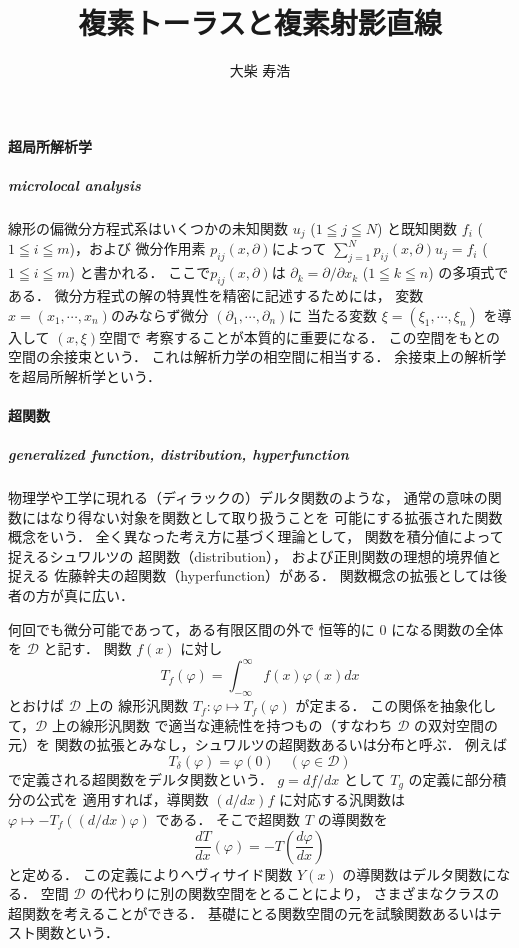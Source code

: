 \documentclass[11pt, a4paper, dvipdfmx]{jsarticle}
\theoremstyle{definition}
\newcommand{\dip}{\displaystyle} %
\newcommand{\pphi}{\varphi} %
\theoremstyle{mystyle}
\numberwithin{equation}{section} %
\begin{document}
\title{複素トーラスと複素射影直線}
\author{大柴 寿浩}
\date{}


\paragraph*{超局所解析学}
\subparagraph*{microlocal analysis}
線形の偏微分方程式系はいくつかの未知関数
$u_j$ ($1\leqq j \leqq N$) と既知関数 $f_i$ ($1\leqq i\leqq m$)，および
微分作用素 $p_{ij}(x, \partial)$によって
$\dip \sum_{j=1}^{N}p_{ij} (x, \partial)u_j=f_i$ ($1\leqq i\leqq m$) と書かれる．
ここで$p_{ij}(x, \partial)$は
$\partial_k=\partial/\partial x_k$ ($1\leqq k \leqq n$) の多項式である．
微分方程式の解の特異性を精密に記述するためには，
変数$x=(x_1,\cdots, x_n)$のみならず微分 $(\partial_1, \cdots, \partial_n)$に
当たる変数 $\xi=(\xi_1, \cdots, \xi_n)$ を導入して $(x, \xi)$空間で
考察することが本質的に重要になる．
この空間をもとの空間の余接束という．
これは解析力学の相空間に相当する．
余接束上の解析学を超局所解析学という．

\paragraph*{超関数}
\subparagraph*{generalized function, distribution, hyperfunction}
物理学や工学に現れる（ディラックの）デルタ関数のような，
通常の意味の関数にはなり得ない対象を関数として取り扱うことを
可能にする拡張された関数概念をいう．
全く異なった考え方に基づく理論として，
関数を積分値によって捉えるシュワルツの
超関数（distribution），
および正則関数の理想的境界値と捉える
佐藤幹夫の超関数（hyperfunction）がある．
関数概念の拡張としては後者の方が真に広い．

何回でも微分可能であって，ある有限区間の外で
恒等的に 0 になる関数の全体を $\mathcal{D}$ と記す．
関数 $f(x)$ に対し
\begin{equation*}
    T_f (\pphi) = \int_{-\infty}^{\infty}f(x)\pphi(x) dx
\end{equation*}
とおけば $\mathcal{D}$ 上の
線形汎関数 $T_f \colon \pphi\mapsto T_f (\pphi)$ が定まる．
この関係を抽象化して，$\mathcal{D}$ 上の線形汎関数
で適当な連続性を持つもの（すなわち $\mathcal{D}$ の双対空間の元）を
関数の拡張とみなし，シュワルツの超関数あるいは分布と呼ぶ．
例えば
\begin{equation*}
    T_\delta(\pphi) = \pphi(0)\quad(\pphi \in \mathcal{D})
\end{equation*}
で定義される超関数をデルタ関数という．
$g=df /dx$ として $T_g$ の定義に部分積分の公式を
適用すれば，導関数 $(d/dx)f$ に対応する汎関数は
$\pphi\mapsto −T_f ((d/dx)\pphi)$ である．
そこで超関数 $T$ の導関数を
\begin{equation*}
    \frac{dT}{dx}(\pphi) = −T\left(\frac{d\pphi}{dx}\right)
\end{equation*}と定める．
この定義によりへヴィサイド関数
$Y (x)$ の導関数はデルタ関数になる．
空間 $\mathcal{D}$ の代わりに別の関数空間をとることにより，
さまざまなクラスの超関数を考えることができる．
基礎にとる関数空間の元を試験関数あるいはテスト関数という．
\end{document}
